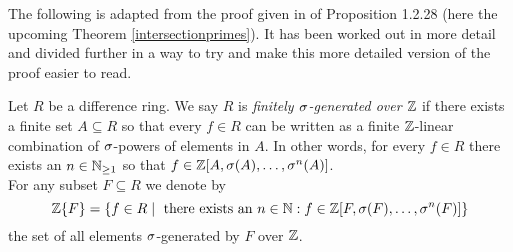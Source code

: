 The following is adapted from the proof given in \cite{wibmer} of Proposition 1.2.28 (here the upcoming Theorem \ref{intersectionprimes}). It has been worked out in more detail and divided further in a way to try and make this more detailed version of the proof easier to read.

\begin{defn}
Let $R$ be a difference ring. We say $R$ is \emph{finitely $\sigma$-generated over $\mathbb{Z}$} if there exists a finite set $A \subseteq R$ so that every $f \in R$ can be written as a finite $\mathbb{Z}$-linear combination of $\sigma$-powers of elements in $A$. In other words,
for every $f \in R$ there exists an $n \in \mathbb{N}_{\geq1}$ so that $f \in \mathbb{Z}[A,\sigma(A),\ldots,\sigma^n(A)]$. \\ 
\indent For any subset $F \subseteq R$ we denote by $$\mathbb{Z}\{F\} = \{ f \in R \mid \text{ there exists an } n \in \mathbb{N}: f \in \mathbb{Z}[F, \sigma(F), \ldots, \sigma^n(F)] \}$$ the set of all elements $\sigma$-generated by $F$ over $\mathbb{Z}$.
\end{defn}

